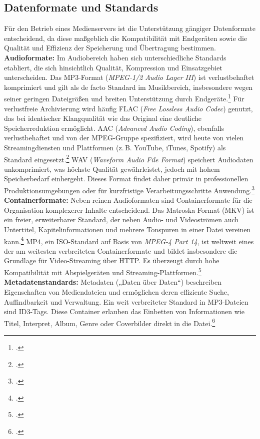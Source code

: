 \documentclass[12pt,a4paper]{report}
\begin{document}
  \subsection{Datenformate und Standards}  
  Für den Betrieb eines Medienservers ist die Unterstützung gängiger Datenformate entscheidend, 
  da diese maßgeblich die Kompatibilität mit Endgeräten sowie die Qualität und Effizienz der Speicherung und Übertragung bestimmen.  
  \\
  \newline
  \textbf{Audioformate:}  
  Im Audiobereich haben sich unterschiedliche Standards etabliert, die sich hinsichtlich Qualität, Kompression und Einsatzgebiet unterscheiden.  
  Das MP3-Format (\emph{MPEG-1/2 Audio Layer III}) ist verlustbehaftet komprimiert und gilt als de facto Standard im Musikbereich, 
  insbesondere wegen seiner geringen Dateigrößen und breiten Unterstützung durch Endgeräte.\footcite[Vgl.][S.~702~f.]{tanenbaum_computernetworks}  
  Für verlustfreie Archivierung wird häufig FLAC (\emph{Free Lossless Audio Codec}) genutzt, 
  das bei identischer Klangqualität wie das Original eine deutliche Speicherreduktion ermöglicht.  
  AAC (\emph{Advanced Audio Coding}), ebenfalls verlustbehaftet und von der MPEG-Gruppe spezifiziert, 
  wird heute von vielen Streamingdiensten und Plattformen (z.\,B. YouTube, iTunes, Spotify) als Standard eingesetzt.\footcite[Vgl.][]{openlearn_aac} 
  WAV (\emph{Waveform Audio File Format}) speichert Audiodaten unkomprimiert, was höchste Qualität gewährleistet, jedoch mit hohem Speicherbedarf einhergeht.
  Dieses Format findet daher primär in professionellen Produktionsumgebungen oder für kurzfristige Verarbeitungsschritte Anwendung.\footcite[Vgl.][]{wikipedia_wav}  
  \\
  \newline
  \textbf{Containerformate:}  
  Neben reinen Audioformaten sind Containerformate für die Organisation komplexerer Inhalte entscheidend.  
  Das Matroska-Format (MKV) ist ein freier, erweiterbarer Standard, der neben Audio- und Videoströmen auch Untertitel, 
  Kapitelinformationen und mehrere Tonspuren in einer Datei vereinen kann.\footcite[Vgl.][siehe 1. Introduction]{rfc9559}  
  MP4, ein ISO-Standard auf Basis von \emph{MPEG-4 Part 14}, ist weltweit eines der am weitesten verbreiteten Containerformate 
  und bildet insbesondere die Grundlage für Video-Streaming über HTTP. 
  Es überzeugt durch hohe Kompatibilität mit Abspielgeräten und Streaming-Plattformen.\footcite[Vgl.][S.~702~f.]{tanenbaum_computernetworks}
  \\
  \newline
  \textbf{Metadatenstandards:}
  Metadaten („Daten über Daten“) beschreiben Eigenschaften von Mediendateien und ermöglichen deren effiziente Suche, Auffindbarkeit und Verwaltung. 
  Ein weit verbreiteter Standard in MP3-Dateien sind ID3-Tags. 
  Diese Container erlauben das Einbetten von Informationen wie Titel, Interpret, Album, Genre oder Coverbilder direkt in die Datei.\footcite[Vgl.][siehe 4. Declared ID3v2 frames]{id3org_spec}
\end{document}
